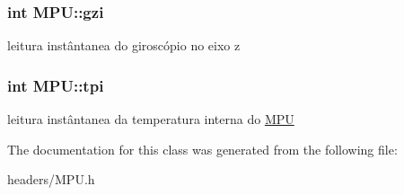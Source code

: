 \subsubsection[{\texorpdfstring{gzi}{gzi}}]{\setlength{\rightskip}{0pt plus 5cm}int M\+P\+U\+::gzi}\hypertarget{class_m_p_u_ac43952f01d98aad441ff08f53aa281a8}{}\label{class_m_p_u_ac43952f01d98aad441ff08f53aa281a8}
leitura instântanea do giroscópio no eixo z 
\subsubsection[{\texorpdfstring{tpi}{tpi}}]{\setlength{\rightskip}{0pt plus 5cm}int M\+P\+U\+::tpi}\hypertarget{class_m_p_u_ab953ed7e9b1ef0b70f0ad97e137616c5}{}\label{class_m_p_u_ab953ed7e9b1ef0b70f0ad97e137616c5}
leitura instântanea da temperatura interna do \hyperlink{class_m_p_u}{M\+PU} 

The documentation for this class was generated from the following file\+:\begin{DoxyCompactItemize}
\item 
headers/M\+P\+U.\+h\end{DoxyCompactItemize}
